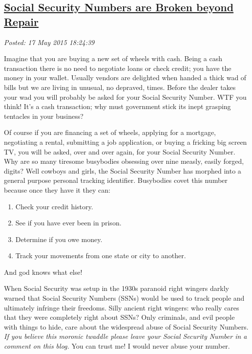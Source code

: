 %

\subsection*{\href{https://bakerjd99.wordpress.com/2015/05/17/social-security-numbers-are-broken-beyond-repair/}{Social Security Numbers are Broken beyond Repair}}


\noindent\emph{Posted: 17 May 2015 18:24:39}
\vspace{6pt}

Imagine that you are buying a new set of wheels with cash. Being a cash
transaction there is no need to negotiate loans or check credit; you
have the money in your wallet. Usually vendors are delighted when handed
a thick wad of bills but we are living in unusual, no depraved, times.
Before the dealer takes your wad you will probably be asked for your
Social Security Number. WTF you think! It's a cash transaction; why must
government stick its inept grasping tentacles in your business?

Of course if you are financing a set of wheels, applying for a mortgage,
negotiating a rental, submitting a job application, or buying a fricking
big screen TV, you will be asked, over and over again, for your Social
Security Number. Why are so many tiresome busybodies obsessing over nine
measly, easily forged, digits? Well cowboys and girls, the Social
Security Number has morphed into a general purpose personal tracking
identifier. Busybodies covet this number because once they have it they
can:

\begin{enumerate}
\itemsep1pt\parskip0pt
\item
  Check your credit history.
\item
  See if you have ever been in prison.
\item
  Determine if you owe money.
\item
  Track your movements from one state or city to another.
\end{enumerate}

And god knows what else!

When Social Security was setup in the 1930s paranoid right wingers
darkly warned that Social Security Numbers (SSNs) would be used to track
people and ultimately infringe their freedoms. Silly ancient right
wingers: who really cares that they were completely right about SSNs?
Only criminals, and evil people with things to hide, care about the
widespread abuse of Social Security Numbers. \emph{If you believe this
moronic twaddle please leave your Social Security Number in a comment on
this blog.} You can trust me! I would never abuse your number.

